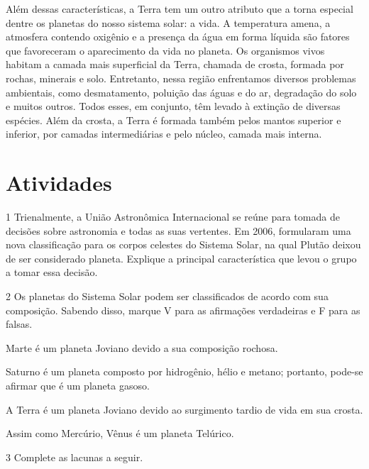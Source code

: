 {Além dessas características, a Terra tem um outro atributo que a torna
especial dentre os planetas do nosso sistema solar: a vida. A
temperatura amena, a atmosfera contendo oxigênio e a presença da água em
forma líquida são fatores que favoreceram o aparecimento da vida no
planeta. Os organismos vivos habitam a camada mais superficial da Terra,
chamada de crosta, formada por rochas, minerais e solo. Entretanto,
nessa região enfrentamos diversos problemas ambientais, como
desmatamento, poluição das águas e do ar, degradação do solo e muitos
outros. Todos esses, em conjunto, têm levado à extinção de diversas
espécies. Além da crosta, a Terra é formada também pelos mantos superior e
inferior, por camadas intermediárias e pelo núcleo, camada mais interna.}

\section{Atividades}

\num{1}  Trienalmente, a União Astronômica Internacional se reúne para tomada
  de decisões sobre astronomia e todas as suas vertentes. Em 2006,
  formularam uma nova classificação para os corpos celestes do Sistema
  Solar, na qual Plutão deixou de ser considerado planeta. Explique a
  principal característica que levou o grupo a tomar essa decisão.



\num{2} Os planetas do Sistema Solar podem ser classificados de acordo com sua
  composição. Sabendo disso, marque V para as afirmações verdadeiras e F para as falsas.

\begin{boxlist}
 Marte é um planeta Joviano devido a sua composição rochosa.

 Saturno é um planeta composto por hidrogênio, hélio e metano;
portanto, pode-se afirmar que é um planeta gasoso.

 A Terra é um planeta Joviano devido ao surgimento tardio de vida em
sua crosta.

 Assim como Mercúrio, Vênus é um planeta Telúrico.
\end{boxlist}

\num{3}  Complete as lacunas a seguir.

